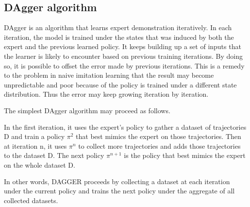 \documentclass[twoside]{article}
\begin{document}




\subsection{DAgger algorithm}
DAgger is an algorithm that learns expert demonstration iteratively. In each iteration, the model is trained under the states that was induced by both the expert and the previous learned policy. It keeps building up a set of inputs that the learner is likely to encounter based on previous training iterations. By doing so, it is possible to offset the error made by previous iterations. This is a remedy to the problem in naive imitation learning that the result may become unpredictable and poor because of the policy is trained under a different state distribution. Thus the error may keep growing iteration by iteration.

The simplest DAgger algorithm may proceed as follows.

In the first iteration, it uses the expert’s policy to gather
a dataset of trajectories D and train a policy $\pi^2$ that best
mimics the expert on those trajectories. Then at iteration
n, it uses $\pi^n$ to collect more trajectories and adds those
trajectories to the dataset D. The next policy $\pi^{n+1}$ is the
policy that best mimics the expert on the whole dataset D.

In other words, DAGGER proceeds by collecting a dataset
at each iteration under the current policy and trains the next policy under the aggregate of all collected datasets. 


\end{document}
